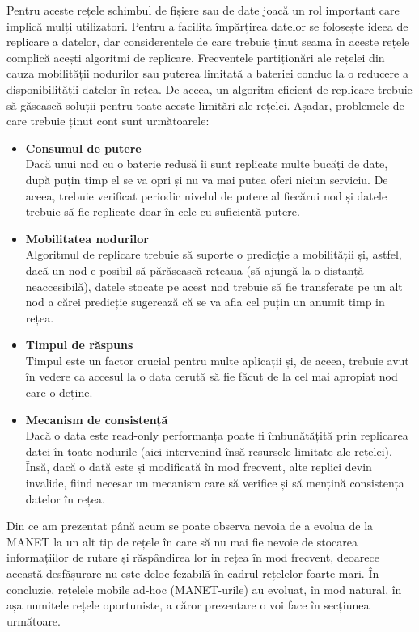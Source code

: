 \documentclass[12pt,a4paper]{report}
\begin{document}
Pentru aceste rețele schimbul de fișiere sau de date joacă un rol important care implică mulți utilizatori. Pentru a facilita împărțirea datelor se folosește ideea de replicare a datelor\cite{CDRA}, dar considerentele de care trebuie ținut seama în aceste rețele complică acești algoritmi de replicare. Frecventele partiționări ale rețelei din cauza mobilității nodurilor sau puterea limitată a bateriei conduc la o reducere a disponibilității datelor în rețea. De aceea, un algoritm eficient de replicare trebuie să găsească soluții pentru toate aceste limitări ale rețelei. Așadar, problemele de care trebuie ținut cont sunt următoarele:
\begin{itemize}
	\item\textbf{Consumul de putere} \hfill \\
	Dacă unui nod cu o baterie redusă îi sunt replicate multe bucăți de date, după puțin timp el se va opri și nu va mai putea oferi niciun serviciu. De aceea, trebuie verificat periodic nivelul de putere al fiecărui nod și datele trebuie să fie replicate doar în cele cu suficientă putere.
	\item\textbf{Mobilitatea nodurilor} \hfill \\
	Algoritmul de replicare trebuie să suporte o predicție a mobilității și, astfel, dacă un nod e posibil să părăsească rețeaua (să ajungă la o distanță neaccesibilă), datele stocate pe acest nod trebuie să fie transferate pe un alt nod a cărei predicție sugerează că se va afla cel puțin un anumit timp in rețea.
	\item\textbf{Timpul de răspuns} \hfill \\
	Timpul este un factor crucial pentru multe aplicații și, de aceea, trebuie avut în vedere ca accesul la o data cerută să fie făcut de la cel mai apropiat nod care o deține.
	\item\textbf{Mecanism de consistență} \hfill \\
	Dacă o data este read-only performanța poate fi îmbunătățită prin replicarea datei în toate nodurile (aici intervenind însă resursele limitate ale rețelei). Însă, dacă o dată este și modificată în mod frecvent, alte replici devin invalide, fiind necesar un mecanism care să verifice și să mențină consistența datelor în rețea.
\end{itemize}
Din ce am prezentat până acum se poate observa nevoia de a evolua de la MANET la un alt tip de rețele în care să nu mai fie nevoie de stocarea informațiilor de rutare și răspândirea lor in rețea în mod frecvent, deoarece această desfășurare nu este deloc fezabilă în cadrul rețelelor foarte mari. În concluzie, rețelele mobile ad-hoc (MANET-urile) au evoluat, în mod natural, în așa numitele rețele oportuniste, a căror prezentare o voi face în secțiunea următoare.
\fi
\end{document}
